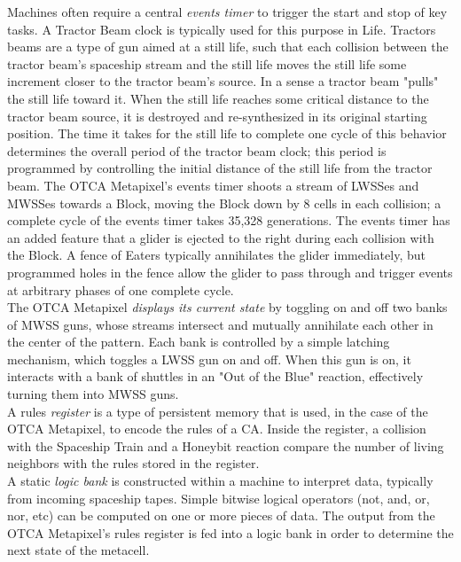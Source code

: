 {Machines often require a central \textit{events timer} to trigger the start and stop of key tasks.  A Tractor Beam clock is typically used for this purpose in Life.  Tractors beams are a type of gun aimed at a still life, such that each collision between the tractor beam's spaceship stream and the still life moves the still life some increment closer to the tractor beam's source.  In a sense a tractor beam "pulls" the still life toward it.  When the still life reaches some critical distance to the tractor beam source, it is destroyed and re-synthesized in its original starting position.  The time it takes for the still life to complete one cycle of this behavior determines the overall period of the tractor beam clock; this period is programmed by controlling the initial distance of the still life from the tractor beam.  The OTCA Metapixel's events timer shoots a stream of LWSSes and MWSSes towards a Block, moving the Block down by 8 cells in each collision; a complete cycle of the events timer takes 35,328 generations.  The events timer has an added feature that a glider is ejected to the right during each collision with the Block.  A fence of Eaters typically annihilates the glider immediately, but programmed holes in the fence allow the glider to pass through and trigger events at arbitrary phases of one complete cycle.\\

The OTCA Metapixel \textit{displays its current state} by toggling on and off two banks of MWSS guns, whose streams intersect and mutually annihilate each other in the center of the pattern.  Each bank is controlled by a simple latching mechanism, which toggles a LWSS gun on and off.  When this gun is on, it interacts with a bank of shuttles in an "Out of the Blue" reaction, effectively turning them into MWSS guns.\\

A rules \textit{register} is a type of persistent memory that is used, in the case of the OTCA Metapixel, to encode the rules of a CA.  Inside the register, a collision with the Spaceship Train and a Honeybit reaction compare the number of living neighbors with the rules stored in the register.\\

A static \textit{logic bank} is constructed within a machine to interpret data, typically from incoming spaceship tapes.  Simple bitwise logical operators (not, and, or, nor, etc) can be computed on one or more pieces of data.  The output from the OTCA Metapixel's rules register is fed into a logic bank in order to determine the next state of the metacell.

}
